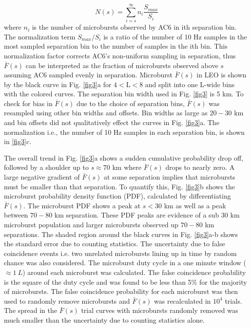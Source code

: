 \documentclass[draft]{agujournal2019}
\begin{document}
\begin{equation}
N(s) = \sum_{i = s}^\infty n_{i} \frac{S_{max}}{S_{i}}
\end{equation} where $n_{i}$ is the number of microbursts observed by AC6 in ith separation bin. The normalization term $S_{max}/S_{i}$ is a ratio of the number of 10 Hz samples in the most sampled separation bin to the number of samples in the ith bin. This normalization factor corrects AC6's non-uniform sampling in separation, thus $\bar{F}(s)$ can be interpreted as the fraction of microbursts observed above $s$ assuming AC6 sampled evenly in separation. Microburst $\bar{F}(s)$ in LEO is shown by the black curve in Fig. \ref{fig3}a for $4 < \mathrm{L}< 8$ and split into one L-wide bins with the colored curves. The separation bin width used in Fig. \ref{fig3} is 5 km. To check for bias in $\bar{F}(s)$ due to the choice of separation bins, $\bar{F}(s)$ was resampled using other bin widths and offsets. Bin widths as large as $20-30$ km and bin offsets did not qualitatively effect the curves in Fig. \ref{fig3}a. The normalization i.e., the number of 10 Hz samples in each separation bin, is shown in \ref{fig3}c.

The overall trend in Fig. \ref{fig3}a shows a sudden cumulative probability drop off, followed by a shoulder up to $s \approx 70$ km where $\bar{F}(s)$ drops to nearly zero. A large negative gradient of $\bar{F}(s)$ at some separation implies that microbursts must be smaller than that separation. To quantify this, Fig. \ref{fig3}b shows the microburst probability density function (PDF), calculated by differentiating $\bar{F}(s)$. The microburst PDF shows a peak at $s < 30$ km as well as a peak between $70-80$ km separation. These PDF peaks are evidence of a sub $30$ km microburst population and larger microbursts observed up $70-80$ km separations. The shaded region around the black curves in Fig. \ref{fig3}a-b shows the standard error due to counting statistics. The uncertainty due to false coincidence events i.e. two unrelated microbursts lining up in time by random chance was also considered. The microburst duty cycle in a one minute window ($\approx 1 \ L$) around each microburst was calculated. The false coincidence probability is the square of the duty cycle and was found to be less than 5\% for the majority of microbursts. The false coincidence probability for each microburst was then used to randomly remove microbursts and $\bar{F}(s)$ was recalculated in $10^4$ trials. The spread in the $\bar{F}(s)$ trial curves with microbursts randomly removed was much smaller than the uncertainty due to counting statistics alone.
\end{document}
